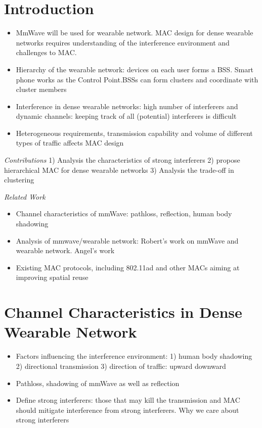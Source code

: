 \documentclass[10pt, conference, letterpaper]{IEEEtran}
\begin{document}
\section{Introduction}\label{section:intro}
\begin{itemize}
\item
MmWave will be used for wearable network. MAC design for dense wearable networks requires understanding of the interference environment and challenges to MAC.
\item
Hierarchy of the wearable network: devices on each user forms a BSS. Smart phone works as the Control Point.BSSs can form clusters and coordinate with cluster members
\item
Interference in dense wearable networks: high number of interferers and dynamic channels: keeping track of all (potential) interferers is difficult
\item
Heterogeneous requirements, transmission capability and volume of different types of traffic affects MAC design
\end{itemize}

\emph{Contributions} 1) Analysis the characteristics of strong interferers 2) propose hierarchical MAC for dense wearable networks 3) Analysis the trade-off in clustering

\emph{Related Work}
\begin{itemize}
\item Channel characteristics of mmWave: pathloss, reflection, human body shadowing
\item Analysis of mmwave/wearable network: Robert's work on mmWave and wearable network. Angel's work
\item Existing MAC protocols, including 802.11ad and other MACs aiming at improving spatial reuse
\end{itemize}

\section{Channel Characteristics in Dense Wearable Network}
\begin{itemize}
\item Factors influencing the interference environment: 1) human body shadowing 2) directional transmission 3) direction of traffic: upward downward
\item Pathloss, shadowing of mmWave as well as reflection
\item Define strong interferers: those that may kill the transmission and MAC should mitigate interference from strong interferers. Why we care about strong interferers
\end{itemize}
\end{document}
